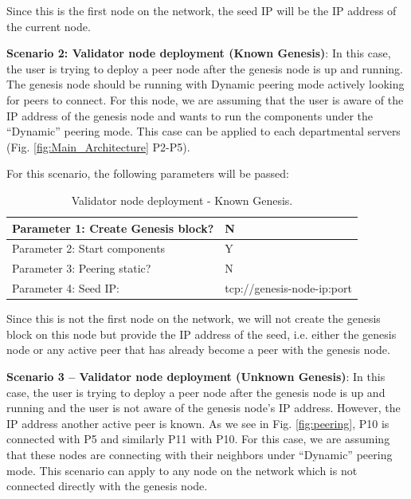 Since this is the first node on the network, the seed IP will be the IP address of the current node. 

\textbf{Scenario 2: Validator node deployment (Known Genesis)}: 
In this case, the user is trying to deploy a peer node after the genesis node is up and running. The genesis node should be running with Dynamic peering mode actively looking for peers to connect. 
For this node, we are assuming that the user is aware of the IP address of the genesis node and wants to run the components under the ``Dynamic'' peering mode. This case can be applied to each departmental servers (Fig. \ref{fig:Main_Architecture} P2-P5).

For this scenario, the following parameters will be passed:
\begin{table}[H]
\centering
\label{tab:node_n_install}
\begin{tabular}{|l|l|}
\hline
Parameter 1: Create Genesis block? & N                          \\ \hline
Parameter 2: Start components      & Y                          \\ \hline
Parameter 3: Peering static?       & N                          \\ \hline
Parameter 4: Seed IP:              & tcp://genesis-node-ip:port \\ \hline
\end{tabular}
\caption{Validator node deployment - Known Genesis.}
\vspace{-4mm}
\end{table}
Since this is not the first node on the network, we will not create the genesis block on this node but provide the IP address of the seed, i.e. either the genesis node or any active peer that has already become a peer with the genesis node.

\textbf{Scenario 3 – Validator node deployment (Unknown Genesis)}: 
In this case, the user is trying to deploy a peer node after the genesis node is up and running and the user is not aware of the genesis node’s IP address. However, the IP address another active peer is known. As we see in Fig. \ref{fig:peering}, P10 is connected with P5 and similarly P11 with P10. For this case, we are assuming that these nodes are connecting with their neighbors under ``Dynamic'' peering mode. This scenario can apply to any node on the network which is not connected directly with the genesis node. 

